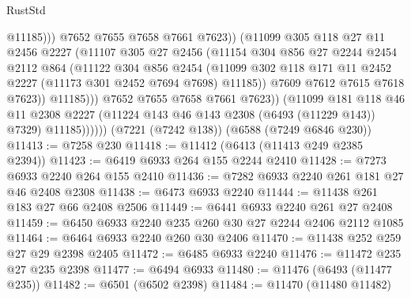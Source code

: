 \begin{lexlean}{RustStd}
\begin{coremodule}
                                @11185)))
                          @7652
                          @7655
                          @7658
                          @7661
                          @7623))
                      (@11099
                        @305
                        @118
                        @27
                        @11
                        @2456
                        @2227
                        (@11107
                          @305
                          @27
                          @2456
                          (@11154
                            @304
                            @856
                            @27
                            @2244
                            @2454
                            @2112
                            @864
                            (@11122
                              @304
                              @856
                              @2454
                              (@11099
                                @302
                                @118
                                @171
                                @11
                                @2452
                                @2227
                                (@11173 @301 @2452 @7694 @7698)
                                @11185))
                            @7609
                            @7612
                            @7615
                            @7618
                            @7623))
                        @11185)))
                  @7652
                  @7655
                  @7658
                  @7661
                  @7623))
              (@11099
                @181
                @118
                @46
                @11
                @2308
                @2227
                (@11224 @143 @46 @143 @2308 (@6493 (@11229 @143)) @7329)
                @11185))))))
    (@7221 (@7242 @138))
    (@6588 (@7249 @6846 @230))
@11413 := @7258 @230
@11418 := @11412 (@6413 (@11413 @249 @2385 @2394))
@11423 := @6419 @6933 @264 @155 @2244 @2410
@11428 := @7273 @6933 @2240 @264 @155 @2410
@11436 := @7282 @6933 @2240 @261 @181 @27 @46 @2408 @2308
@11438 := @6473 @6933 @2240
@11444 := @11438 @261 @183 @27 @66 @2408 @2506
@11449 := @6441 @6933 @2240 @261 @27 @2408
@11459 := @6450 @6933 @2240 @235 @260 @30 @27 @2244 @2406 @2112 @1085
@11464 := @6464 @6933 @2240 @260 @30 @2406
@11470 := @11438 @252 @259 @27 @29 @2398 @2405
@11472 := @6485 @6933 @2240
@11476 := @11472 @235 @27 @235 @2398
@11477 := @6494 @6933
@11480 := @11476 (@6493 (@11477 @235))
@11482 := @6501 (@6502 @2398)
@11484 := @11470 (@11480 @11482)

\end{coremodule}
\end{lexlean}
